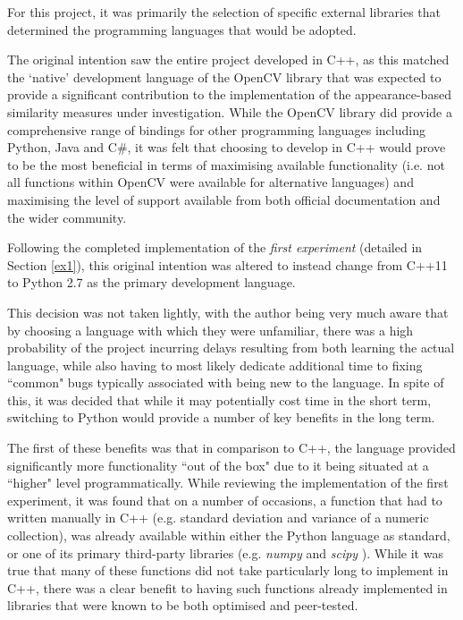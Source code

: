 For this project, it was primarily the selection of specific external libraries that determined the programming languages that would be adopted.

The original intention saw the entire project developed in C++, as this matched the `native' development language of the OpenCV library \cite{opencv} that was expected to provide a significant contribution to the implementation of the appearance-based similarity measures under investigation. While the OpenCV library did provide a comprehensive range of bindings for other programming languages including Python, Java and C\#, it was felt that choosing to develop in C++ would prove to be the most beneficial in terms of maximising available functionality (i.e. not all functions within OpenCV were available for alternative languages) and maximising the level of support available from both official documentation and the wider community. 

Following the completed implementation of the \textit{first experiment} (detailed in Section \ref{ex1}), this original intention was altered to instead change from C++11 to Python 2.7 as the primary development language. 

This decision was not taken lightly, with the author being very much aware that by choosing a language with which they were unfamiliar, there was a high probability of the project incurring delays resulting from both learning the actual language, while also having to most likely dedicate additional time to fixing ``common" bugs typically associated with being new to the language. In spite of this, it was decided that while it may potentially cost time in the short term, switching to Python would provide a number of key benefits in the long term. 

The first of these benefits was that in comparison to C++, the language provided significantly more functionality ``out of the box" due to it being situated at a ``higher" level programmatically. While reviewing the implementation of the first experiment, it was found that on a number of occasions, a function that had to written manually in C++ (e.g. standard deviation and variance of a numeric collection), was already available within either the Python language as standard, or one of its primary third-party libraries (e.g. \textit{numpy} \cite{numpy} and \textit{scipy} \cite{scipy}). While it was true that many of these functions did not take particularly long to implement in C++, there was a clear benefit to having such functions already implemented in libraries that were known to be both optimised and peer-tested. 

